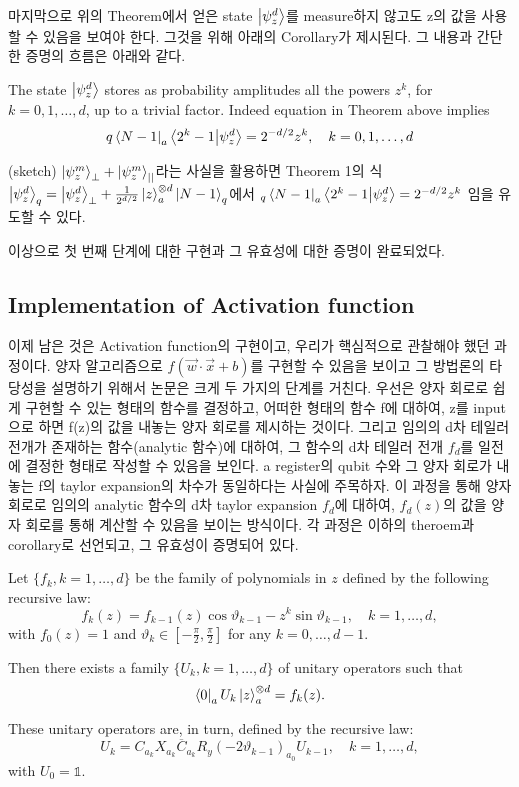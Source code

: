 마지막으로 위의 Theorem에서 얻은 state \(\ket{\psi_z^d}\)를 measure하지 않고도 z의 값을 사용할 수 있음을 보여야 한다.
그것을 위해 아래의 Corollary가 제시된다. 그 내용과 간단한 증명의 흐름은 아래와 같다.

\begin{corollary}
    The state $\ket{\psi_z^d}$ stores as probability amplitudes all the powers $z^k$, for $k = 0, 1, \ldots, d$, up to a trivial factor. Indeed equation in Theorem above implies
\[
q \bra{N - 1}_a \bra{2^k - 1} \ket{\psi_z^d} = 2^{-d/2} z^k, \quad k = 0, 1, \ldots, d
\]
\end{corollary}

\begin{pf}(sketch)
    \(\ket{\psi_z^m}_\perp + \ket{\psi_z^m}_{||}\)라는 사실을 활용하면
    Theorem 1의 식 \(\ket{\psi_z^d}_q = \ket{\psi_z^d}_\perp + \frac{1}{2^{d/2}}\ket{z}_a^{\otimes d}\ket{N-1}_q\)에서 \(_q\bra{N-1}_a\bra{2^k-1}\ket{\psi_z^d} = 2^{-d/2}z^k\) 임을 유도할 수 있다.
\end{pf}

이상으로 첫 번째 단계에 대한 구현과 그 유효성에 대한 증명이 완료되었다.

\subsection{Implementation of Activation function}

이제 남은 것은 Activation function의 구현이고, 우리가 핵심적으로 관찰해야 했던 과정이다.
양자 알고리즘으로 \(f(\vec{w}\cdot\vec{x}+b)\)를 구현할 수 있음을 보이고 그 방법론의 타당성을 설명하기 위해서 논문은 크게 두 가지의 단계를 거친다.
우선은 양자 회로로 쉽게 구현할 수 있는 형태의 함수를 결정하고,
어떠한 형태의 함수 f에 대하여, z를 input으로 하면 f(z)의 값을 내놓는 양자 회로를 제시하는 것이다.
그리고 임의의 d차 테일러 전개가 존재하는 함수(analytic 함수)에 대하여, 그 함수의 d차 테일러 전개 \(f_d\)를 일전에 결정한 형태로 작성할 수 있음을 보인다.
a register의 qubit 수와 그 양자 회로가 내놓는 f의 taylor expansion의 차수가 동일하다는 사실에 주목하자.
이 과정을 통해 양자 회로로 임의의 analytic 함수의 d차 taylor expansion \(f_d\)에 대하여, \(f_d(z)\)의 값을 양자 회로를 통해 계산할 수 있음을 보이는 방식이다.
각 과정은 이하의 theroem과 corollary로 선언되고, 그 유효성이 증명되어 있다.

\begin{theorem}
    Let $\{f_k, k = 1, \ldots, d\}$ be the family of polynomials in $z$ defined by the following recursive law:
\[
f_k(z) = f_{k-1}(z) \cos \vartheta_{k-1} - z^k \sin \vartheta_{k-1}, \quad k = 1, \ldots, d,
\]
with $f_0(z) = 1$ and $\vartheta_k \in \left[-\frac{\pi}{2}, \frac{\pi}{2}\right]$ for any $k = 0, \ldots, d-1$.

Then there exists a family $\{U_k, k = 1, \ldots, d\}$ of unitary operators such that
\[
\bra{0}_a U_k \ket{z}_a^{\otimes d} = f_k(z).
\]

These unitary operators are, in turn, defined by the recursive law:
\[
U_k = C_{a_k} X_{a_k} \overline{C}_{a_k} R_y(-2 \vartheta_{k-1})_{a_0} U_{k-1}, \quad k = 1, \ldots, d,
\]
with $U_0 = \mathbb{1}$.

\end{theorem}

